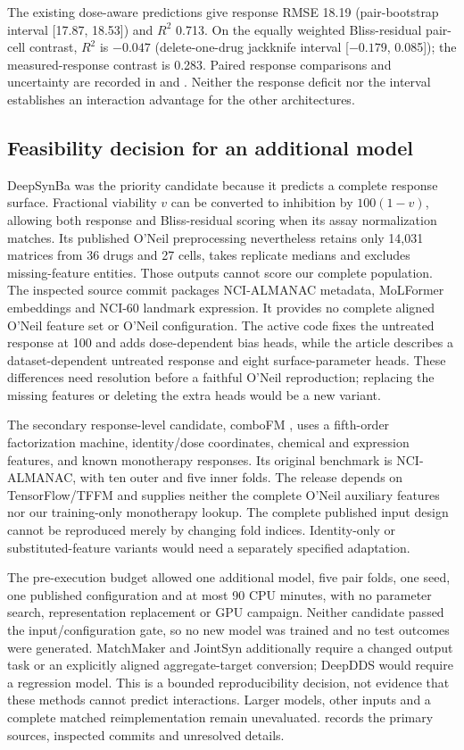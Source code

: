 \documentclass[11pt]{article}
\begin{document}
The existing dose-aware predictions give response RMSE 18.19 (pair-bootstrap interval [17.87, 18.53]) and $R^2$ 0.713. On the equally weighted Bliss-residual pair-cell contrast, $R^2$ is $-0.047$ (delete-one-drug jackknife interval [$-0.179$, 0.085]); the measured-response contrast is 0.283. Paired response comparisons and uncertainty are recorded in  and . Neither the response deficit nor the interval establishes an interaction advantage for the other architectures.

\subsection{Feasibility decision for an additional model}
DeepSynBa \citep{kuru2026deepsynba} was the priority candidate because it predicts a complete response surface. Fractional viability $v$ can be converted to inhibition by $100(1-v)$, allowing both response and Bliss-residual scoring when its assay normalization matches. Its published O'Neil preprocessing nevertheless retains only 14,031 matrices from 36 drugs and 27 cells, takes replicate medians and excludes missing-feature entities. Those outputs cannot score our complete population. The inspected source commit  packages NCI-ALMANAC metadata, MoLFormer embeddings and NCI-60 landmark expression. It provides no complete aligned O'Neil feature set or O'Neil configuration. The active code fixes the untreated response at 100 and adds dose-dependent bias heads, while the article describes a dataset-dependent untreated response and eight surface-parameter heads. These differences need resolution before a faithful O'Neil reproduction; replacing the missing features or deleting the extra heads would be a new variant.

The secondary response-level candidate, comboFM \citep{julkunen2020}, uses a fifth-order factorization machine, identity/dose coordinates, chemical and expression features, and known monotherapy responses. Its original benchmark is NCI-ALMANAC, with ten outer and five inner folds. The release depends on TensorFlow/TFFM and supplies neither the complete O'Neil auxiliary features nor our training-only monotherapy lookup. The complete published input design cannot be reproduced merely by changing fold indices. Identity-only or substituted-feature variants would need a separately specified adaptation.

The pre-execution budget allowed one additional model, five pair folds, one seed, one published configuration and at most 90 CPU minutes, with no parameter search, representation replacement or GPU campaign. Neither candidate passed the input/configuration gate, so no new model was trained and no test outcomes were generated. MatchMaker and JointSyn additionally require a changed output task or an explicitly aligned aggregate-target conversion; DeepDDS would require a regression model. This is a bounded reproducibility decision, not evidence that these methods cannot predict interactions. Larger models, other inputs and a complete matched reimplementation remain unevaluated.  records the primary sources, inspected commits and unresolved details.

\begin{references}

\end{references}
\end{document}
